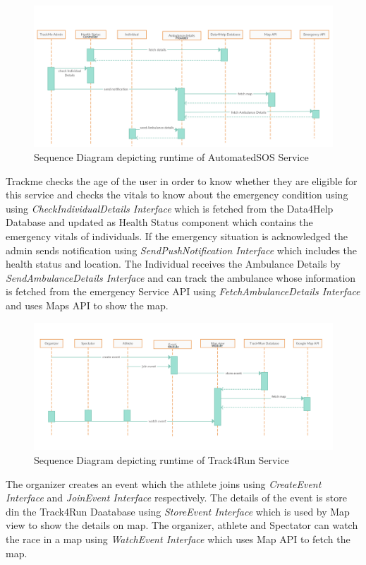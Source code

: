 \begin{figure}[H]
	\begin{center}
		\includegraphics[width=\textwidth]{./DD_Diagrams/RuntimeAutomatedSOS.png}
      \caption{Sequence Diagram depicting runtime of AutomatedSOS Service}
        \label{TrackMe_r2}
	\end{center}
\end{figure}
Trackme checks the age of the user in order to know whether they are eligible for this service and checks the vitals to know about the emergency condition using  using \textit{CheckIndividualDetails Interface} which is fetched from the Data4Help Database and updated as Health Status component which contains the emergency vitals of individuals.\newline 
If the emergency situation is acknowledged the admin sends notification using \textit{SendPushNotification Interface} which includes the health status and location.\newline
The Individual receives the Ambulance Details by \textit{SendAmbulanceDetails Interface} and can track the ambulance whose information is fetched from the emergency Service API using \textit{FetchAmbulanceDetails Interface} and uses Maps API to show the map.
\begin{figure}[H]
	\begin{center}
		\includegraphics[width=\textwidth]{./DD_Diagrams/RuntimeTrack4Run.png}
      \caption{Sequence Diagram depicting runtime of Track4Run Service}
        \label{TrackMe_r3}
	\end{center}
\end{figure}
The organizer creates an event which the athlete joins using \textit{CreateEvent Interface} and \textit{JoinEvent Interface} respectively. The details of the event is store din the Track4Run Daatabase using \textit{StoreEvent Interface} which is used by Map view to show the details on map. The organizer, athlete and Spectator can watch the race in a map using \textit{WatchEvent Interface} which uses Map API to fetch the map.